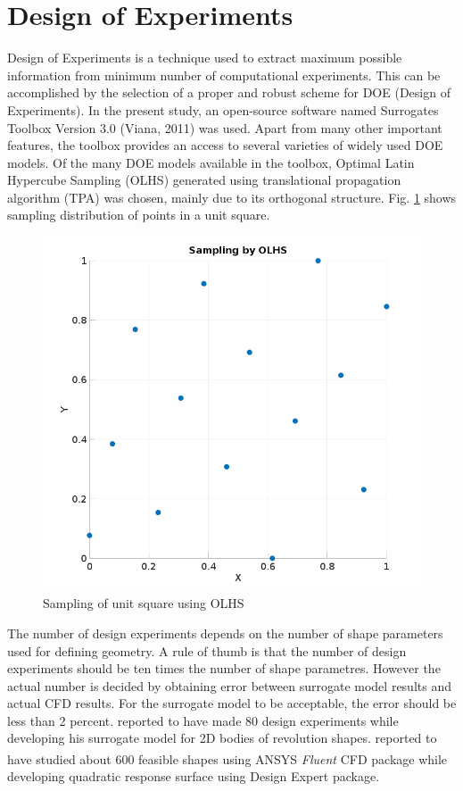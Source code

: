 \section{Design of Experiments}
\label{DOE}
Design of Experiments is a technique used to extract maximum possible information from minimum number of computational experiments. This can be accomplished by the selection of a proper and robust scheme for DOE (Design of Experiments). In the present study, an open-source software named Surrogates Toolbox Version 3.0 (Viana, 2011) was used. Apart from many other important features, the toolbox provides an access to several varieties of widely used DOE models. Of the many DOE models available in the toolbox, Optimal Latin Hypercube Sampling (OLHS) generated using translational propagation algorithm (TPA) \cite{Viana2011} was chosen, mainly due to its orthogonal structure. Fig. \ref{OLHS Sampling} shows sampling distribution of points in a unit square.

\begin{figure}[htbp]
	\centering
	\includegraphics[width=200 pt]{optimization/OLHS_DOE}
	\caption{Sampling of unit square using OLHS }
	\label{OLHS Sampling}
\end{figure}

 The number of design experiments depends on the number of shape parameters used for defining geometry. A rule of thumb is that the number of design experiments should be ten times the number of shape parametres. However the actual number is decided by obtaining error between surrogate model results and actual CFD results. For the surrogate model to be acceptable, the error should be less than 2 percent. \cite{alam2016mdo} reported to have made 80 design experiments while developing his surrogate model for 2D bodies of revolution shapes. \cite{Kale2005a} reported to have studied about 600 feasible shapes using ANSYS\textsuperscript{\textregistered} \textit{Fluent} CFD package while developing quadratic response surface using Design Expert package.

